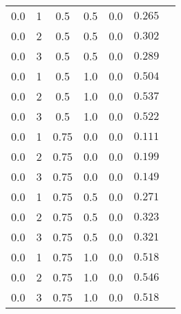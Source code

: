 \begin{longtable}{ccccccc}
    0.0 & 1 & 0.5 & 0.5 &  0.0  & $0.265$ \\
    0.0 & 2 & 0.5 & 0.5 &  0.0  & $0.302$ \\
    0.0 & 3 & 0.5 & 0.5 &  0.0  & $0.289$ \\ \hline

    0.0 & 1 & 0.5 & 1.0 &  0.0  & $0.504$ \\
    0.0 & 2 & 0.5 & 1.0 &  0.0  & $0.537$ \\
    0.0 & 3 & 0.5 & 1.0 &  0.0  & $0.522$ \\ \hline

    0.0 & 1 & 0.75 & 0.0 &  0.0  & $0.111$ \\
    0.0 & 2 & 0.75 & 0.0 &  0.0  & $0.199$ \\
    0.0 & 3 & 0.75 & 0.0 &  0.0  & $0.149$ \\ \hline

    0.0 & 1 & 0.75 & 0.5 &  0.0  & $0.271$ \\
    0.0 & 2 & 0.75 & 0.5 &  0.0  & $0.323$ \\
    0.0 & 3 & 0.75 & 0.5 &  0.0  & $0.321$ \\ \hline

    0.0 & 1 & 0.75 & 1.0 &  0.0  & $0.518$ \\
    0.0 & 2 & 0.75 & 1.0 &  0.0  & $0.546$ \\
    0.0 & 3 & 0.75 & 1.0 &  0.0  & $0.518$ \\ \hline
\end{longtable}

